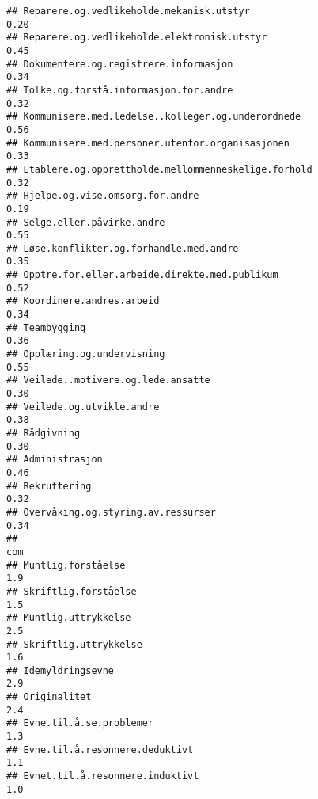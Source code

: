 \documentclass[
]{article}
\begin{document}
\begin{verbatim}
## Reparere.og.vedlikeholde.mekanisk.utstyr                                         0.20
## Reparere.og.vedlikeholde.elektronisk.utstyr                                      0.45
## Dokumentere.og.registrere.informasjon                                            0.34
## Tolke.og.forstå.informasjon.for.andre                                            0.32
## Kommunisere.med.ledelse..kolleger.og.underordnede                                0.56
## Kommunisere.med.personer.utenfor.organisasjonen                                  0.33
## Etablere.og.opprettholde.mellommenneskelige.forhold                              0.32
## Hjelpe.og.vise.omsorg.for.andre                                                  0.19
## Selge.eller.påvirke.andre                                                        0.55
## Løse.konflikter.og.forhandle.med.andre                                           0.35
## Opptre.for.eller.arbeide.direkte.med.publikum                                    0.52
## Koordinere.andres.arbeid                                                         0.34
## Teambygging                                                                      0.36
## Opplæring.og.undervisning                                                        0.55
## Veilede..motivere.og.lede.ansatte                                                0.30
## Veilede.og.utvikle.andre                                                         0.38
## Rådgivning                                                                       0.30
## Administrasjon                                                                   0.46
## Rekruttering                                                                     0.32
## Overvåking.og.styring.av.ressurser                                               0.34
##                                                                                  com
## Muntlig.forståelse                                                               1.9
## Skriftlig.forståelse                                                             1.5
## Muntlig.uttrykkelse                                                              2.5
## Skriftlig.uttrykkelse                                                            1.6
## Idemyldringsevne                                                                 2.9
## Originalitet                                                                     2.4
## Evne.til.å.se.problemer                                                          1.3
## Evne.til.å.resonnere.deduktivt                                                   1.1
## Evnet.til.å.resonnere.induktivt                                                  1.0

\end{verbatim}
\end{document}
